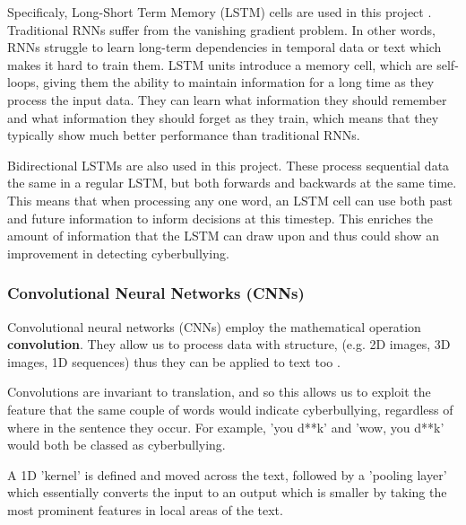 \documentclass[12pt,a4paper]{article}
\begin{document}
	Specificaly, Long-Short Term Memory (LSTM) cells are used in this project \cite[p.410]{DL}. Traditional RNNs suffer from the vanishing gradient problem. In other words, RNNs struggle to learn long-term dependencies in temporal data or text which makes it hard to train them. LSTM units introduce a memory cell, which are self-loops, giving them the ability to maintain information for a long time as they process the input data. They can learn what information they should remember and what information they should forget as they train, which means that they typically show much better performance than traditional RNNs.
	
	Bidirectional LSTMs are also used in this project. These process sequential data the same in a regular LSTM, but both forwards and backwards at the same time. This means that when processing any one word, an LSTM cell can use both past and future information to inform decisions at this timestep. This enriches the amount of information that the LSTM can draw upon and thus could show an improvement in detecting cyberbullying.
	
	\subsubsection{Convolutional Neural Networks (CNNs)}
	
	Convolutional neural networks (CNNs) employ the mathematical operation \textbf{convolution}. They allow us to process data with structure, (e.g. 2D images, 3D images, 1D sequences) thus they can be applied to text too \cite[p.330]{DL}.
	
	Convolutions are invariant to translation, and so this allows us to exploit the feature that the same couple of words would indicate cyberbullying, regardless of where in the sentence they occur. For example, 'you d**k' and 'wow, you d**k' would both be classed as cyberbullying.
	
	A 1D 'kernel' is defined and moved across the text, followed by a 'pooling layer' which essentially converts the input to an output which is smaller by taking the most prominent features in local areas of the text. \cite[p.339]{DL} 
	
\end{document}
